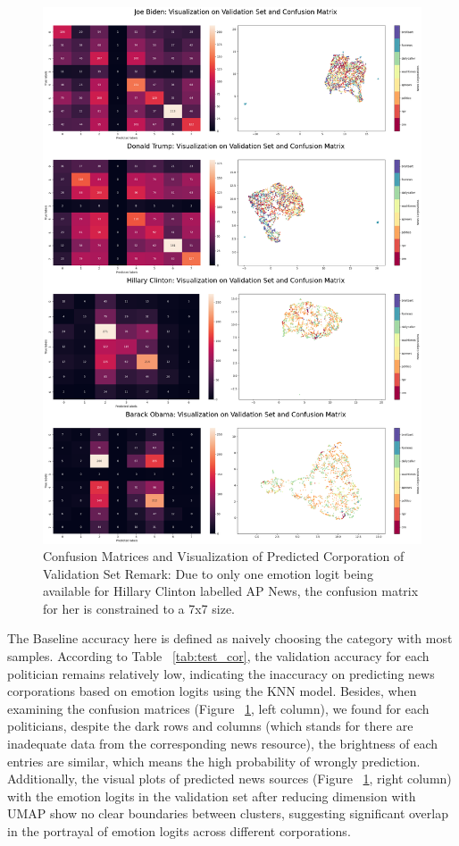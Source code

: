 \documentclass[sigconf]{acmart}
\begin{document}
\begin{figure}
    \centering
    \includegraphics[width=.5\textwidth]{assets/test_cm_cor.png}
    \caption{Confusion Matrices and Visualization of Predicted Corporation of Validation Set \newline Remark: Due to only one emotion logit being available for Hillary Clinton labelled AP News, the confusion matrix for her is constrained to a 7x7 size. }
    \label{fig:test_vis}
    \vspace{10pt}
\end{figure}

The Baseline accuracy here is defined as naively choosing the category with most samples. According to Table ~\ref{tab:test_cor}, the validation accuracy for each politician remains relatively low, indicating the inaccuracy on predicting news corporations based on emotion logits using the KNN model. Besides, when examining the confusion matrices (Figure ~\ref{fig:test_vis}, left column), we found for each politicians, despite the dark rows and columns (which stands for there are inadequate data from the corresponding news resource), the brightness of each entries are similar, which means the high probability of wrongly prediction. Additionally, the visual plots of predicted news sources (Figure ~\ref{fig:test_vis}, right column) with the emotion logits in the validation set after reducing dimension with UMAP show no clear boundaries between clusters, suggesting significant overlap in the portrayal of emotion logits across different corporations.
\end{document}
